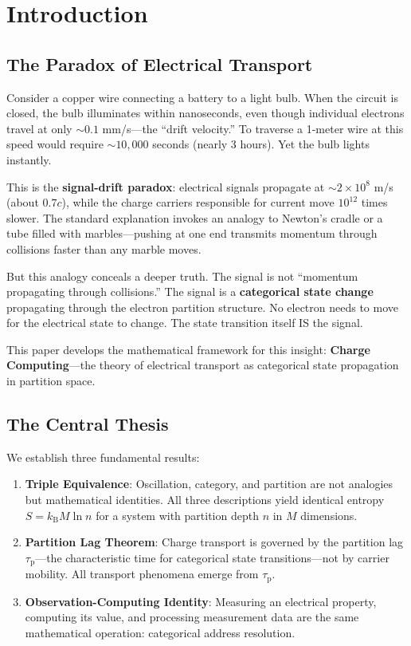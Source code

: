 \documentclass[twocolumn,10pt]{article}
\theoremstyle{definition}
\theoremstyle{remark}
\newcommand{\kB}{k_{\mathrm{B}}}
\newcommand{\taup}{\tau_{\mathrm{p}}}
\begin{document}
\section{Introduction}
\label{sec:introduction}

\subsection{The Paradox of Electrical Transport}

Consider a copper wire connecting a battery to a light bulb. When the circuit is closed, the bulb illuminates within nanoseconds, even though individual electrons travel at only $\sim 0.1$ mm/s---the ``drift velocity.'' To traverse a 1-meter wire at this speed would require $\sim 10,000$ seconds (nearly 3 hours). Yet the bulb lights instantly.

This is the \textbf{signal-drift paradox}: electrical signals propagate at $\sim 2 \times 10^8$ m/s (about $0.7c$), while the charge carriers responsible for current move $10^{12}$ times slower. The standard explanation invokes an analogy to Newton's cradle or a tube filled with marbles---pushing at one end transmits momentum through collisions faster than any marble moves.

But this analogy conceals a deeper truth. The signal is not ``momentum propagating through collisions.'' The signal is a \textbf{categorical state change} propagating through the electron partition structure. No electron needs to move for the electrical state to change. The state transition itself IS the signal.

This paper develops the mathematical framework for this insight: \textbf{Charge Computing}---the theory of electrical transport as categorical state propagation in partition space.

\subsection{The Central Thesis}

We establish three fundamental results:

\begin{enumerate}
    \item \textbf{Triple Equivalence}: Oscillation, category, and partition are not analogies but mathematical identities. All three descriptions yield identical entropy $S = \kB M \ln n$ for a system with partition depth $n$ in $M$ dimensions.

    \item \textbf{Partition Lag Theorem}: Charge transport is governed by the partition lag $\taup$---the characteristic time for categorical state transitions---not by carrier mobility. All transport phenomena emerge from $\taup$.

    \item \textbf{Observation-Computing Identity}: Measuring an electrical property, computing its value, and processing measurement data are the same mathematical operation: categorical address resolution.
\end{enumerate}
\end{document}
